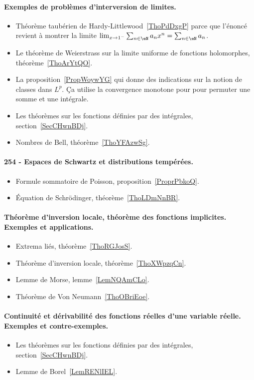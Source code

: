 \paragraph{Exemples de problèmes d’interversion de limites.}
\begin{itemize}
	\item Théorème taubérien de Hardy-Littlewood~\ref{ThoPdDxgP} parce que l'énoncé revient à montrer la limite \( \lim_{x\to 1^-} \sum_{n\in \eN}a_nx^n=\sum_{n\in \eN}a_n\).
	\item Le théorème de Weierstrass sur la limite uniforme de fonctions holomorphes, théorème~\ref{ThoArYtQO}.
	\item La proposition~\ref{PropWoywYG} qui donne des indications sur la notion de classes dans \( L^p\). Ça utilise la convergence monotone pour  pour permuter une somme et une intégrale.
	\item Les théorèmes sur les fonctions définies par des intégrales, section~\ref{SecCHwnBDj}.
	\item Nombres de Bell, théorème~\ref{ThoYFAzwSg}.
\end{itemize}
\paragraph{254 - Espaces de Schwartz et distributions tempérées.}
\begin{itemize}
	\item Formule sommatoire de Poisson, proposition~\ref{ProprPbkoQ}.
	\item Équation de Schrödinger, théorème~\ref{ThoLDmNnBR}.
\end{itemize}

\paragraph{Théorème d’inversion locale, théorème des fonctions implicites. Exemples et applications.}
\begin{itemize}
	\item Extrema liés, théorème~\ref{ThoRGJosS}.
	\item Théorème d'inversion locale, théorème~\ref{ThoXWpzqCn}.
	\item Lemme de Morse, lemme~\ref{LemNQAmCLo}.
	\item Théorème de Von Neumann~\ref{ThoOBriEoe}.
\end{itemize}
\paragraph{Continuité et dérivabilité des fonctions réelles d'une variable réelle. Exemples et contre-exemples.}
\begin{itemize}
	\item Les théorèmes sur les fonctions définies par des intégrales, section~\ref{SecCHwnBDj}.
	\item Lemme de Borel~\ref{LemRENlIEL}.
\end{itemize}
